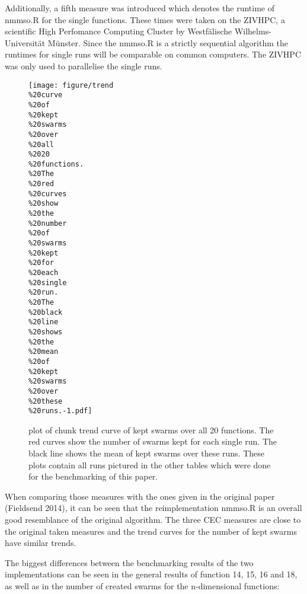 \documentclass[12pt,a4paper]{article}
\begin{document}
Additionally, a fifth measure was introduced which denotes the runtime
of nmmso.R for the single functions. These times were taken on the
ZIVHPC, a scientific High Perfomance Computing Cluster by Westfälische
Wilhelms-Universität Münster. Since the nmmso.R is a strictly sequential
algorithm the runtimes for single runs will be comparable on common
computers. The ZIVHPC was only used to parallelise the single runs.

\begin{figure}[htbp]
\centering
\texttt{[image: figure/trend\\\%20curve\\\%20of\\\%20kept\\\%20swarms\\\%20over\\\%20all\\\%2020\\\%20functions.\\\%20The\\\%20red\\\%20curves\\\%20show\\\%20the\\\%20number\\\%20of\\\%20swarms\\\%20kept\\\%20for\\\%20each\\\%20single\\\%20run.\\\%20The\\\%20black\\\%20line\\\%20shows\\\%20the\\\%20mean\\\%20of\\\%20kept\\\%20swarms\\\%20over\\\%20these\\\%20runs.-1.pdf]}
\caption{plot of chunk trend curve of kept swarms over all 20 functions.
The red curves show the number of swarms kept for each single run. The
black line shows the mean of kept swarms over these runs. These plots
contain all runs pictured in the other tables which were done for the
benchmarking of this paper.}
\end{figure}

When comparing those measures with the ones given in the original paper
(Fieldsend 2014), it can be seen that the reimplementation nmmso.R is an
overall good resemblance of the original algorithm. The three CEC
measures are close to the original taken measures and the trend curves
for the number of kept swarms have similar trends.

The biggest differences between the benchmarking results of the two
implementations can be seen in the general results of function 14, 15,
16 and 18, as well as in the number of created swarms for the
n-dimensional functions:
\end{document}
